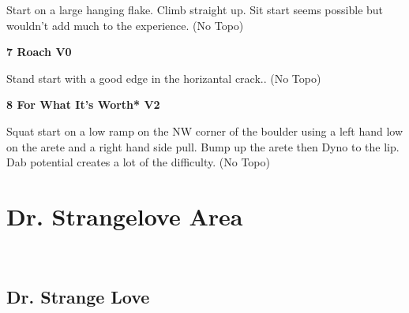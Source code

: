 \begin{multicols}{2}
\begin{minipage}{\linewidth}
					\begin{adjustwidth}{0.5cm}{}				
					Start on a large hanging flake. Climb straight up. Sit start seems possible but wouldn't add much to the experience.
						\newline (No Topo) 
					\end{adjustwidth}
					\end{minipage}
					\begin{minipage}{\linewidth}	
					\label{rt:Roach}
\colorbox{green!20}{
\parbox{0.95\textwidth}{
\textbf{
7 Roach V0    
}
}
}

					\begin{adjustwidth}{0.5cm}{}				
					Stand start with a good edge in the horizantal crack..
						\newline (No Topo) 
					\end{adjustwidth}
					\end{minipage}
					\begin{minipage}{\linewidth}	
					\label{rt:For What It's Worth}
\colorbox{green!20}{
\parbox{0.95\textwidth}{
\textbf{
8 For What It's Worth* V2    
}
}
}

					\begin{adjustwidth}{0.5cm}{}				
					Squat start on a low ramp on the NW corner of the boulder using a left hand low on the arete and a right hand side pull. Bump up the arete then Dyno to the lip. Dab potential creates a lot of the difficulty.
						\newline (No Topo) 
					\end{adjustwidth}
					\end{minipage}
\newpage
		\section{Dr. Strangelove Area}\label{sa:Dr. Strangelove Area}
	\begin{minipage}{\columnwidth}
	\
	\end{minipage}
	
			\begin{minipage}{\columnwidth}
			\subsection*{Dr. Strange Love}\label{bf:Dr. Strange Love}
			\
			
			\end{minipage}
			
\end{multicols}
\clearpage